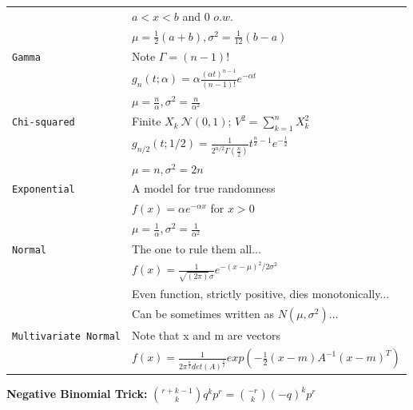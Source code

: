 \documentclass[10pt,landscape]{article}
\begin{document}
\begin{multicols*}{3}
\begin{tabular}{@{}ll@{}}
	\verb!! &$ a<x<b$ and $0$ $o.w.$\\
	\verb!! &$\mu=\frac{1}{2}(a+b), \sigma^2=\frac{1}{12}(b-a)$\\
	\verb!Gamma!& Note $\Gamma =(n-1)!$  \\
	\verb!! &$g_n(t;\alpha)=\alpha \frac{(\alpha t)^{n-1}} {(n-1)!}e^{-\alpha t}$\\
	\verb!! &$\mu=\frac{n}{\alpha}  , \sigma^2=\frac{n}{\alpha^2}$\\
	\verb!Chi-squared!  & Finite $X_k ~\mathcal{N}(0,1)$; $V^2=\sum_{k=1}^{n} X_k^2$ \\
	\verb!! & $g_{n/2}(t;1/2)=\frac{1}{2^{n/2}\Gamma(\frac{n}{2})}t^{\frac{n}{2} -1}e^{-\frac{t}{2}}$\\
	\verb!! &$\mu=n  , \sigma^2=2n$\\	
	\verb!Exponential!  & A model for true randomness \\
	\verb!! & $f(x)=\alpha e^{-\alpha x}$ for $x>0$\\
	\verb!! &$\mu=\frac{1}{\alpha}  , \sigma^2=\frac{1}{\alpha^2}$\\
	\verb!Normal! & The one to rule them all... \\
	\verb!! & $f(x) = \frac{1}{\sqrt{(2 \pi)} \sigma} e^{-(x-\mu)^{2}/2 \sigma^{2}}$ \\
	\verb!! & \hspace{-75pt} Even function, strictly positive, dies monotonically...\\
	\verb!! & \hspace{-75pt} Can be sometimes written as $N(\mu,\sigma^2)$...\\
	\verb!Multivariate Normal! & Note that x and m are vectors \\
	\verb!! & \hspace{-55pt}$f(x)=\frac{1}{2\pi^{\frac{n}{2}} det(A)^{\frac{1}{2}}}exp(-\frac{1}{2}(x-m)A^{-1}(x-m)^T)$
	
\end{tabular}

\textbf{Negative Binomial Trick:}
$ { r+k-1 \choose k}q^kp^r={-r \choose k}(-q)^kp^r$

\end{multicols*}
\end{document}
